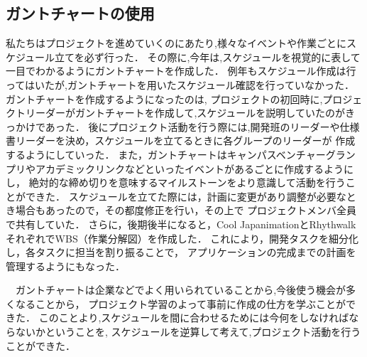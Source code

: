 \subsection{ガントチャートの使用}
\par
私たちはプロジェクトを進めていくのにあたり,様々なイベントや作業ごとにスケジュール立てを必ず行った．
その際に,今年は,スケジュールを視覚的に表して一目でわかるようにガントチャートを作成した．
例年もスケジュール作成は行ってはいたが,ガントチャートを用いたスケジュール確認を行っていなかった．
ガントチャートを作成するようになったのは,
プロジェクトの初回時に,プロジェクトリーダーがガントチャートを作成して,スケジュールを説明していたのがきっかけであった．
後にプロジェクト活動を行う際には,開発班のリーダーや仕様書リーダーを決め，スケジュールを立てるときに各グループのリーダーが
作成するようにしていった．
また，ガントチャートはキャンパスベンチャーグランプリやアカデミックリンクなどといったイベントがあるごとに作成するようにし，
絶対的な締め切りを意味するマイルストーンをより意識して活動を行うことができた．
スケジュールを立てた際には，計画に変更があり調整が必要なとき場合もあったので，その都度修正を行い，その上で
プロジェクトメンバ全員で共有していた．
さらに，後期後半になると，Cool JapanimationとRhythwalkそれぞれでWBS（作業分解図）を作成した．
これにより，開発タスクを細分化し，各タスクに担当を割り振ることで，
アプリケーションの完成までの計画を管理するようにもなった．

　ガントチャートは企業などでよく用いられていることから,今後使う機会が多くなることから，
プロジェクト学習のよって事前に作成の仕方を学ぶことができた．
このことより,スケジュールを間に合わせるためには今何をしなければならないかということを,
スケジュールを逆算して考えて,プロジェクト活動を行うことができた．
